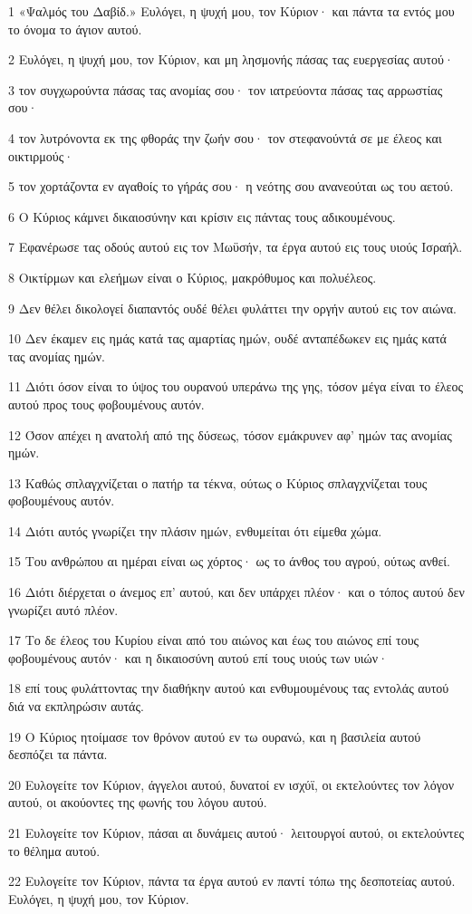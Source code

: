 \par 1 «Ψαλμός του Δαβίδ.» Ευλόγει, η ψυχή μου, τον Κύριον· και πάντα τα εντός μου το όνομα το άγιον αυτού.
\par 2 Ευλόγει, η ψυχή μου, τον Κύριον, και μη λησμονής πάσας τας ευεργεσίας αυτού·
\par 3 τον συγχωρούντα πάσας τας ανομίας σου· τον ιατρεύοντα πάσας τας αρρωστίας σου·
\par 4 τον λυτρόνοντα εκ της φθοράς την ζωήν σου· τον στεφανούντά σε με έλεος και οικτιρμούς·
\par 5 τον χορτάζοντα εν αγαθοίς το γήράς σου· η νεότης σου ανανεούται ως του αετού.
\par 6 Ο Κύριος κάμνει δικαιοσύνην και κρίσιν εις πάντας τους αδικουμένους.
\par 7 Εφανέρωσε τας οδούς αυτού εις τον Μωϋσήν, τα έργα αυτού εις τους υιούς Ισραήλ.
\par 8 Οικτίρμων και ελεήμων είναι ο Κύριος, μακρόθυμος και πολυέλεος.
\par 9 Δεν θέλει δικολογεί διαπαντός ουδέ θέλει φυλάττει την οργήν αυτού εις τον αιώνα.
\par 10 Δεν έκαμεν εις ημάς κατά τας αμαρτίας ημών, ουδέ ανταπέδωκεν εις ημάς κατά τας ανομίας ημών.
\par 11 Διότι όσον είναι το ύψος του ουρανού υπεράνω της γης, τόσον μέγα είναι το έλεος αυτού προς τους φοβουμένους αυτόν.
\par 12 Όσον απέχει η ανατολή από της δύσεως, τόσον εμάκρυνεν αφ' ημών τας ανομίας ημών.
\par 13 Καθώς σπλαγχνίζεται ο πατήρ τα τέκνα, ούτως ο Κύριος σπλαγχνίζεται τους φοβουμένους αυτόν.
\par 14 Διότι αυτός γνωρίζει την πλάσιν ημών, ενθυμείται ότι είμεθα χώμα.
\par 15 Του ανθρώπου αι ημέραι είναι ως χόρτος· ως το άνθος του αγρού, ούτως ανθεί.
\par 16 Διότι διέρχεται ο άνεμος επ' αυτού, και δεν υπάρχει πλέον· και ο τόπος αυτού δεν γνωρίζει αυτό πλέον.
\par 17 Το δε έλεος του Κυρίου είναι από του αιώνος και έως του αιώνος επί τους φοβουμένους αυτόν· και η δικαιοσύνη αυτού επί τους υιούς των υιών·
\par 18 επί τους φυλάττοντας την διαθήκην αυτού και ενθυμουμένους τας εντολάς αυτού διά να εκπληρώσιν αυτάς.
\par 19 Ο Κύριος ητοίμασε τον θρόνον αυτού εν τω ουρανώ, και η βασιλεία αυτού δεσπόζει τα πάντα.
\par 20 Ευλογείτε τον Κύριον, άγγελοι αυτού, δυνατοί εν ισχύϊ, οι εκτελούντες τον λόγον αυτού, οι ακούοντες της φωνής του λόγου αυτού.
\par 21 Ευλογείτε τον Κύριον, πάσαι αι δυνάμεις αυτού· λειτουργοί αυτού, οι εκτελούντες το θέλημα αυτού.
\par 22 Ευλογείτε τον Κύριον, πάντα τα έργα αυτού εν παντί τόπω της δεσποτείας αυτού. Ευλόγει, η ψυχή μου, τον Κύριον.

